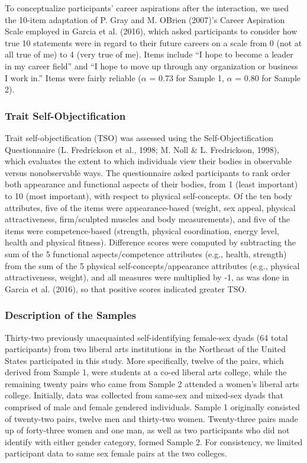 \documentclass[man]{apa6}
\begin{document}
To conceptualize participants' career aspirations after the interaction,
we used the 10-item adaptation of P. Gray and M. OBrien (2007)'s Career
Aspiration Scale employed in Garcia et al. (2016), which asked
participants to consider how true 10 statements were in regard to their
future careers on a scale from 0 (not at all true of me) to 4 (very true
of me). Items include \enquote{I hope to become a leader in my career
field} and \enquote{I hope to move up through any organization or
business I work in.} Items were fairly reliable (\(\alpha\) = 0.73 for
Sample 1, \(\alpha\) = 0.80 for Sample 2).

\subsubsection{Trait
Self-Objectification}\label{trait-self-objectification}

Trait self-objectification (TSO) was assessed using the
Self-Objectification Questionnaire (L. Fredrickson et al., 1998; M. Noll
\& L. Fredrickson, 1998), which evaluates the extent to which
individuals view their bodies in observable versus nonobservable ways.
The questionnaire asked participants to rank order both appearance and
functional aspects of their bodies, from 1 (least important) to 10 (most
important), with respect to physical self-concepts. Of the ten body
attributes, five of the items were appearance-based (weight, sex appeal,
physical attractiveness, firm/sculpted muscles and body measurements),
and five of the items were competence-based (strength, physical
coordination, energy level, health and physical fitness). Difference
scores were computed by subtracting the sum of the 5 functional
aspects/competence attributes (e.g., health, strength) from the sum of
the 5 physical self-concepts/appearance attributes (e.g., physical
attractiveness, weight), and all measures were multiplied by -1, as was
done in Garcia et al. (2016), so that positive scores indicated greater
TSO.

\subsubsection{Description of the
Samples}\label{description-of-the-samples}

Thirty-two previously unacquainted self-identifying female-sex dyads (64
total participants) from two liberal arts institutions in the Northeast
of the United States participated in this study. More specifically,
twelve of the pairs, which derived from Sample 1, were students at a
co-ed liberal arts college, while the remaining twenty pairs who came
from Sample 2 attended a women's liberal arts college. Initially, data
was collected from same-sex and mixed-sex dyads that comprised of male
and female gendered individuals. Sample 1 originally consisted of
twenty-two pairs, twelve men and thirty-two women. Twenty-three pairs
made up of forty-three women and one man, as well as two participants
who did not identify with either gender category, formed Sample 2. For
consistency, we limited participant data to same sex female pairs at the
two colleges.
\end{document}
